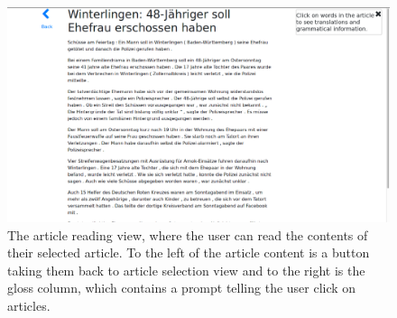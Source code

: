\begin{figure}[H]
	\caption[Screenshot of the Article Reading View]{The article reading view, where the user can read the contents of their selected article. To the left of the article content is a button taking them back to article selection view and to the right is the gloss column, which contains a prompt telling the user click on articles. }
	\label{fig:view3}
	\begin{center}
	\includegraphics[width=\textwidth]{Graphics/View3}
\end{center}
\end{figure}